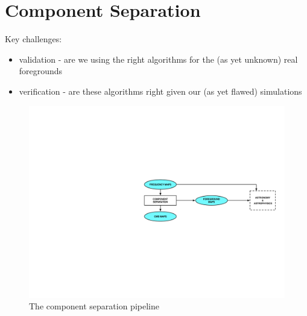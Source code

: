 
\section{Component Separation}

Key challenges:
\begin{itemize}
\item validation - are we using the right algorithms for the (as yet unknown) real foregrounds
\item verification - are these algorithms right given our (as yet flawed) simulations
\end{itemize}

\begin{figure}[htbp]
\centering
\includegraphics[width=1\textwidth]{Analysis/cs}
\caption{The component separation pipeline}
\label{default}

\end{figure}

%



